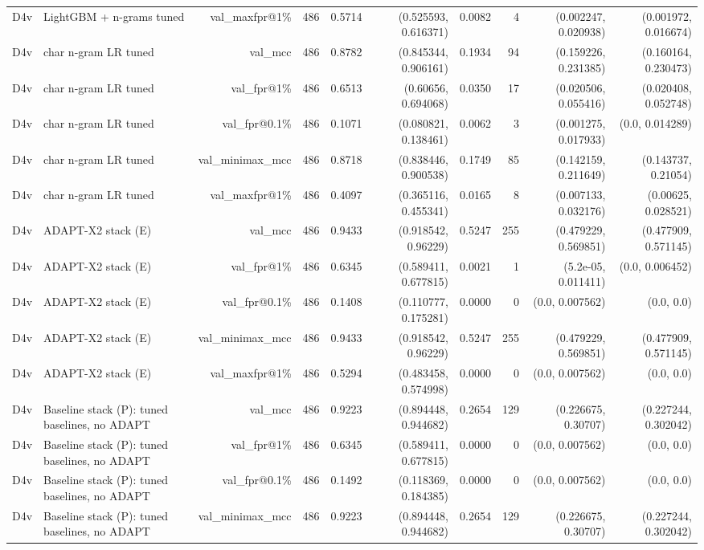 \begin{table}[t]
\begin{tabular}{llrrrrrrrr}
D4v & LightGBM + n-grams tuned & val\_maxfpr@1\% & 486 & 0.5714 & (0.525593, 0.616371) & 0.0082 & 4 & (0.002247, 0.020938) & (0.001972, 0.016674) \\
D4v & char n-gram LR tuned & val\_mcc & 486 & 0.8782 & (0.845344, 0.906161) & 0.1934 & 94 & (0.159226, 0.231385) & (0.160164, 0.230473) \\
D4v & char n-gram LR tuned & val\_fpr@1\% & 486 & 0.6513 & (0.60656, 0.694068) & 0.0350 & 17 & (0.020506, 0.055416) & (0.020408, 0.052748) \\
D4v & char n-gram LR tuned & val\_fpr@0.1\% & 486 & 0.1071 & (0.080821, 0.138461) & 0.0062 & 3 & (0.001275, 0.017933) & (0.0, 0.014289) \\
D4v & char n-gram LR tuned & val\_minimax\_mcc & 486 & 0.8718 & (0.838446, 0.900538) & 0.1749 & 85 & (0.142159, 0.211649) & (0.143737, 0.21054) \\
D4v & char n-gram LR tuned & val\_maxfpr@1\% & 486 & 0.4097 & (0.365116, 0.455341) & 0.0165 & 8 & (0.007133, 0.032176) & (0.00625, 0.028521) \\
D4v & ADAPT-X2 stack (E) & val\_mcc & 486 & 0.9433 & (0.918542, 0.96229) & 0.5247 & 255 & (0.479229, 0.569851) & (0.477909, 0.571145) \\
D4v & ADAPT-X2 stack (E) & val\_fpr@1\% & 486 & 0.6345 & (0.589411, 0.677815) & 0.0021 & 1 & (5.2e-05, 0.011411) & (0.0, 0.006452) \\
D4v & ADAPT-X2 stack (E) & val\_fpr@0.1\% & 486 & 0.1408 & (0.110777, 0.175281) & 0.0000 & 0 & (0.0, 0.007562) & (0.0, 0.0) \\
D4v & ADAPT-X2 stack (E) & val\_minimax\_mcc & 486 & 0.9433 & (0.918542, 0.96229) & 0.5247 & 255 & (0.479229, 0.569851) & (0.477909, 0.571145) \\
D4v & ADAPT-X2 stack (E) & val\_maxfpr@1\% & 486 & 0.5294 & (0.483458, 0.574998) & 0.0000 & 0 & (0.0, 0.007562) & (0.0, 0.0) \\
D4v & Baseline stack (P): tuned baselines, no ADAPT & val\_mcc & 486 & 0.9223 & (0.894448, 0.944682) & 0.2654 & 129 & (0.226675, 0.30707) & (0.227244, 0.302042) \\
D4v & Baseline stack (P): tuned baselines, no ADAPT & val\_fpr@1\% & 486 & 0.6345 & (0.589411, 0.677815) & 0.0000 & 0 & (0.0, 0.007562) & (0.0, 0.0) \\
D4v & Baseline stack (P): tuned baselines, no ADAPT & val\_fpr@0.1\% & 486 & 0.1492 & (0.118369, 0.184385) & 0.0000 & 0 & (0.0, 0.007562) & (0.0, 0.0) \\
D4v & Baseline stack (P): tuned baselines, no ADAPT & val\_minimax\_mcc & 486 & 0.9223 & (0.894448, 0.944682) & 0.2654 & 129 & (0.226675, 0.30707) & (0.227244, 0.302042) \\

\end{tabular}
\end{table}
